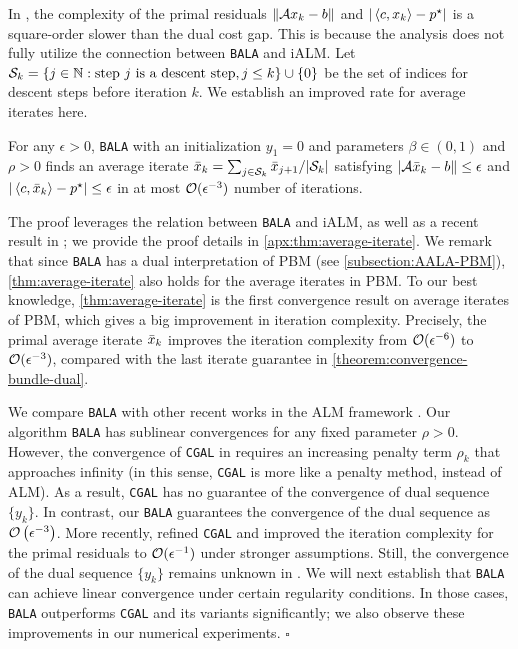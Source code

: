 \documentclass[11pt]{article}
\newcommand{\alg}{\texttt{BALA}}%
\newcommand{\CGAL}{\texttt{CGAL}}
\begin{document}
In , the complexity of the primal residuals $\| \mathcal{A} x_k - b\|$ and $|\left \langle c, x_k \right\rangle - p^\star|$ is a square-order slower than the dual cost gap. This is because the analysis does not fully utilize the connection between \alg{} and iALM. Let $\mathcal{S}_k = \{ j \in \mathbb{N} :\text{step } j \text{ is a descent step}, j \leq k \} \cup \{0\}$ be the set of indices for descent steps before iteration $k$. We establish an improved rate for average iterates here.
\begin{theorem} 
    \label{thm:average-iterate}
     For any $\epsilon > 0$, \alg{} with an initialization $y_1 = 0$ and parameters $\beta \in  (0,1)$ and $\rho  >  0$ finds an average iterate $\Bar{x}_k  =  \sum_{j \in \mathcal{S}_k} \bar{x}_{j+1} /|\mathcal{S}_k| $ satisfying $ |\mathcal{A}  \Bar{x}_k - b\|\leq \epsilon$ and $|\left \langle c, \Bar{x}_k \right\rangle - p^\star |  \leq \epsilon$ in at most $\mathcal{O}(\epsilon^{-3})$ number of iterations. 
\end{theorem}
The proof leverages the relation between \alg{} and iALM, as well as a recent result in \cite[Theorem 4]{xu2021iteration}; we provide the proof details in \cref{apx:thm:average-iterate}. {We remark that since \alg{} has a dual interpretation of PBM (see \cref{subsection:AALA-PBM}), \cref{thm:average-iterate} also holds for the average iterates in PBM. To our best knowledge, \cref{thm:average-iterate} is the first convergence result on average iterates of PBM, which gives a big improvement in iteration complexity. Precisely, the primal average iterate $\Bar{x}_k$ improves the iteration complexity from $\mathcal{O}(\epsilon^{-6})$ to $\mathcal{O}(\epsilon^{-3})$, compared with  the last iterate guarantee in \cref{theorem:convergence-bundle-dual}.} 

    \begin{remark}
    We compare \alg{} with other recent works in the ALM framework \cite{yurtsever2019conditional,yurtsever2021scalable,garber2023faster}. 
   Our algorithm \alg{} has sublinear convergences for any fixed parameter $\rho>0$. However, the convergence of \CGAL{} in \cite{yurtsever2019conditional,yurtsever2021scalable} requires an increasing penalty term $\rho_k$ that approaches infinity (in this sense, \CGAL{} is more like a penalty method, instead of ALM). As a result, \CGAL{} has no guarantee of the convergence of dual sequence $\{y_k\}$. In contrast, our \alg{} guarantees the convergence of the dual sequence as  $ \mathcal{O} \left (\epsilon^{-3}\right )$. More recently, \cite{garber2023faster} refined \CGAL{}  and improved the iteration complexity for the primal residuals to $\mathcal{O}(\epsilon^{-1})$ under stronger assumptions. Still, the convergence of the dual sequence $\{y_k\}$ remains unknown in \cite{garber2023faster}. We will next establish that \alg{} can achieve linear convergence under certain regularity conditions. In those cases, \alg{} outperforms \CGAL{} and its variants significantly; we also observe these improvements in our numerical experiments.   \hfill $\square$
    \end{remark}
\end{document}
